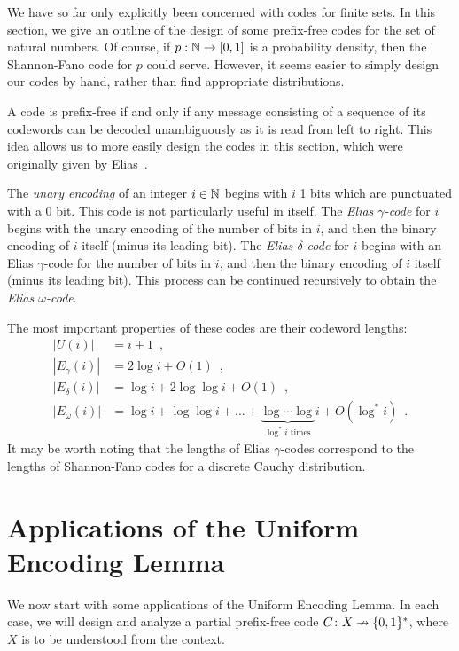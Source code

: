 \documentclass{patmorin}
\begin{document}
We have so far only explicitly been concerned with codes for finite
sets. In this section, we give an outline of the design of some
prefix-free codes for the set of natural numbers. Of course, if $p :
\mathbb{N} \to [0, 1]$ is a probability density, then the Shannon-Fano code
for $p$ could serve. However, it seems easier to simply design our
codes by hand, rather than find appropriate distributions.

A code is prefix-free if and only if any message consisting of a
sequence of its codewords can be decoded unambiguously as it is read
from left to right. This idea allows us to more easily design the
codes in this section, which were originally given by
Elias~\cite{elias:coding}.

The \emph{unary encoding} of an integer $i \in \mathbb{N}$ begins with $i$ 1
bits which are punctuated with a 0 bit. This code is not particularly
useful in itself. The \emph{Elias $\gamma$-code} for $i$ begins with
the unary encoding of the number of bits in $i$, and then the binary
encoding of $i$ itself (minus its leading bit). The \emph{Elias
  $\delta$-code} for $i$ begins with an Elias $\gamma$-code for the
number of bits in $i$, and then the binary encoding of $i$ itself
(minus its leading bit). This process can be continued recursively to
obtain the \emph{Elias $\omega$-code}.

The most important properties of these codes are their codeword
lengths:
\begin{align*}
  |U(i)| &= i + 1 \enspace , \tag{Unary code} \\
  |E_\gamma(i)| &= 2 \log i + O(1) \enspace , \tag{Elias $\gamma$-code} \\
  |E_\delta(i)| &= \log i + 2 \log \log i + O(1) \enspace , \tag{Elias $\delta$-code} \\
  |E_\omega(i)| &= \log i + \log \log i + \dots + \underbrace{\log \cdots \log}_{\text{$\log^* i$ times}}i + O(\log^* i) \enspace . \tag{Elias $\omega$-code}
\end{align*}
It may be worth noting that the lengths of Elias $\gamma$-codes
correspond to the lengths of Shannon-Fano codes for a discrete Cauchy
distribution.

\section{Applications of the Uniform Encoding Lemma}

We now start with some applications of the Uniform Encoding Lemma. In
each case, we will design and analyze a partial prefix-free code
$C\colon X\nrightarrow \{0, 1\}^*$, where $X$ is to be understood from
the context.
\end{document}
